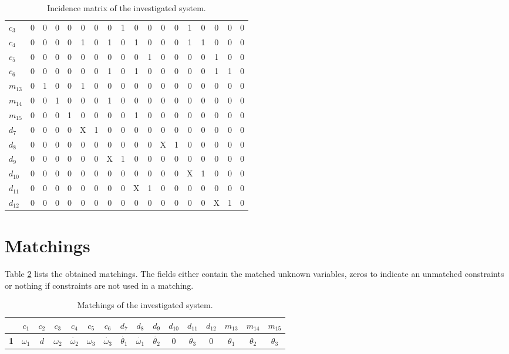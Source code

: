 \documentclass[a4,11pt]{article}
\begin{document}
\begin{table}[!htb]
\begin{tabular}{|l|cccc|ccccccccccccc|}
$c_3$  & 0 & 0 & 0 & 0 & 0 & 0 & 0 & 1 & 0 & 0 & 0 & 0 & 1 & 0 & 0 & 0 & 0 \\ 
$c_4$  & 0 & 0 & 0 & 0 & 1 & 0 & 1 & 0 & 1 & 0 & 0 & 0 & 1 & 1 & 0 & 0 & 0 \\ 
$c_5$  & 0 & 0 & 0 & 0 & 0 & 0 & 0 & 0 & 0 & 1 & 0 & 0 & 0 & 0 & 1 & 0 & 0 \\ 
$c_6$  & 0 & 0 & 0 & 0 & 0 & 0 & 1 & 0 & 1 & 0 & 0 & 0 & 0 & 0 & 1 & 1 & 0 \\ 
$m_{13}$  & 0 & 1 & 0 & 0 & 1 & 0 & 0 & 0 & 0 & 0 & 0 & 0 & 0 & 0 & 0 & 0 & 0 \\ 
$m_{14}$  & 0 & 0 & 1 & 0 & 0 & 0 & 1 & 0 & 0 & 0 & 0 & 0 & 0 & 0 & 0 & 0 & 0 \\ 
$m_{15}$  & 0 & 0 & 0 & 1 & 0 & 0 & 0 & 0 & 1 & 0 & 0 & 0 & 0 & 0 & 0 & 0 & 0 \\ 
\hline
$d_7$  & 0 & 0 & 0 & 0 & X & 1 & 0 & 0 & 0 & 0 & 0 & 0 & 0 & 0 & 0 & 0 & 0 \\ 
$d_8$  & 0 & 0 & 0 & 0 & 0 & 0 & 0 & 0 & 0 & 0 & X & 1 & 0 & 0 & 0 & 0 & 0 \\ 
$d_9$  & 0 & 0 & 0 & 0 & 0 & 0 & X & 1 & 0 & 0 & 0 & 0 & 0 & 0 & 0 & 0 & 0 \\ 
$d_{10}$  & 0 & 0 & 0 & 0 & 0 & 0 & 0 & 0 & 0 & 0 & 0 & 0 & X & 1 & 0 & 0 & 0 \\ 
$d_{11}$  & 0 & 0 & 0 & 0 & 0 & 0 & 0 & 0 & X & 1 & 0 & 0 & 0 & 0 & 0 & 0 & 0 \\ 
$d_{12}$  & 0 & 0 & 0 & 0 & 0 & 0 & 0 & 0 & 0 & 0 & 0 & 0 & 0 & 0 & X & 1 & 0 \\ \hline
\end{tabular}
\caption{Incidence matrix of the investigated system.}
\label{tab:matrix}
\end{table}
\newpage
\section{Matchings}
Table \ref{tab:matchings} lists the obtained matchings. The fields either contain the matched unknown variables, zeros to indicate an unmatched constraints or nothing if constraints are not used in a matching.\setlength\tabcolsep{2mm}

\begin{table}[!htb]
\centering
\normalsize
\begin{tabular}{|c|c|c|c|c|c|c|c|c|c|c|c|c|c|c|c|}
\hline
~ & \textbf{$c_1$} & \textbf{$c_2$} & \textbf{$c_3$} & \textbf{$c_4$} & \textbf{$c_5$} & \textbf{$c_6$} & \textbf{$d_7$} & \textbf{$d_8$} & \textbf{$d_9$} & \textbf{$d_{10}$} & \textbf{$d_{11}$} & \textbf{$d_{12}$} & \textbf{$m_{13}$} & \textbf{$m_{14}$} & \textbf{$m_{15}$}\\ \hline 
\textbf{1} & $\omega_1$ & $d$ & $\omega_2$ & $\dot{\omega_2}$ & $\omega_3$ & $\dot{\omega_3}$ & $\dot{\theta_1}$ & $\dot{\omega_1}$ & $\dot{\theta_2}$ & 0 & $\dot{\theta_3}$ & 0 & $\theta_1$ & $\theta_2$ & $\theta_3$\\ \hline 
\end{tabular}
\caption{Matchings of the investigated system.}
\label{tab:matchings}
\end{table}
\end{document}
